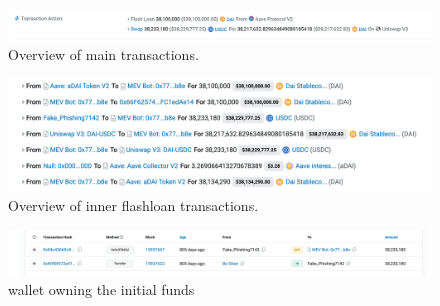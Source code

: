 \documentclass[11pt,a4paper,titlepage]{scrartcl}
\begin{document}
\begin{figure}[ht]
    \centering %
    \includegraphics[width=\textwidth, keepaspectratio]{image/boshen/boshen1.png}
    \caption{Overview of main transactions.}
    \label{fig:boshen1}
\end{figure}


\begin{figure}[ht]
    \centering %
    \includegraphics[width=\textwidth, keepaspectratio]{image/boshen/boshen2.png}
    \caption{Overview of inner flashloan transactions.}
    \label{fig:boshen2}
\end{figure}

\begin{figure}[ht]
    \centering %
    \includegraphics[width=\textwidth, keepaspectratio]{image/boshen/boshen3.png}
    \caption{wallet owning the initial funds}
    \label{fig:boshen3}
\end{figure}
\end{document}
